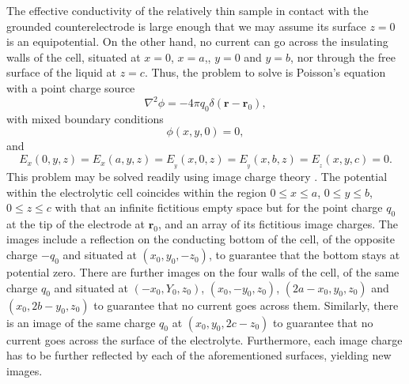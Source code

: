 \documentclass{article}
\begin{document}
The effective conductivity of the relatively thin sample in contact
with the grounded counterelectrode is large enough that we may assume its
surface $z=0$ is an equipotential.
On the other hand, no current can go across the insulating walls of
the cell, situated at $x=0$, $x=a$,, $y=0$ and $y=b$, nor through the
free surface of the liquid at $z=c$. Thus, the problem to solve is Poisson's
equation with a point charge source
\begin{equation}
  \label{eq:poisson}
  \nabla^2\phi=-4\pi q_0\delta(\bm r-\bm r_0),
\end{equation}
with mixed boundary conditions
\begin{equation}
  \label{eq:ground}
  \phi(x,y,0)=0,
\end{equation}
and
\begin{equation}
E_x(0, y ,z)= E_x(a, y ,z)=E_{{_y}}(x, 0 ,z)=E_{{_y}}(x, b
,z)=E_{{_z}}(x, y ,c)=0.
\end{equation}
This problem may be solved readily using image charge theory \cite{T1,T2}.
The potential within the electrolytic cell coincides
within the region $0\le x\le a$, $0\le y \le b$, $0\le z\le c$
with that an infinite fictitious empty space but for the point charge
$q_0$ at the tip of the electrode at $\bm r_0$, and an array of its fictitious image
charges. The images include a reflection on the conducting bottom of the
cell, of the opposite charge $-q_0$ and situated at $(x_0, y_0,-z_0)$,
to guarantee that the bottom stays at potential zero.
There are further images on the four walls of the cell, of the same charge $q_0$
and situated at $(-x_0,Y_0,z_0)$, $(x_0,-y_0, z_0)$, $(2a-x_0, y_0,
z_0)$ and $(x_0, 2b-y_0,z_0)$ to guarantee that no current goes across
them. Similarly, there is an image of the same charge $q_0$ at
$(x_0,y_0,2c-z_0)$ to guarantee that no current goes across the
surface of the electrolyte. Furthermore, each image charge has to be
further reflected by each of the aforementioned surfaces, yielding new
images.
\end{document}
